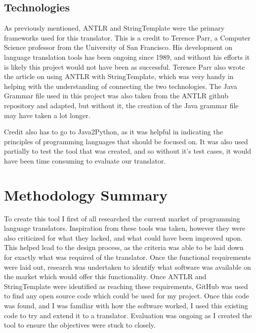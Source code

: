\documentclass{l4proj}
\begin{document}
\subsection{Technologies}
As previously mentioned, ANTLR and StringTemplate were the primary frameworks used for this translator. This is a credit to Terence Parr, a Computer Science professor from the University of San Francisco. His development on language translation tools has been ongoing since 1989, and without his efforts it is likely this project would not have been as successful.
Terence Parr also wrote the article on using ANTLR with StringTemplate, which was very handy in helping with the understanding of connecting the two technologies.
The Java Grammar file used in this project was also taken from the ANTLR github repository and adapted, but without it, the creation of the Java grammar file may have taken a lot longer.

Credit also has to go to Java2Python, as it was helpful in indicating the principles of programming languages that should be focused on. It was also used partially to test the tool that was created, and so without it's test cases, it would have been time consuming to evaluate our translator.

\section{Methodology Summary}
To create this tool I first of all researched the current market of programming language translators. Inspiration from these tools was taken, however they were also criticized for what they lacked, and what could have been improved upon.
This helped lead to the design process, as the criteria was able to be laid down for exactly what was required of the translator.
Once the functional requirements were laid out, research was undertaken to identify what software was available on the market which would offer this functionality. 
Once ANTLR and StringTemplate were identified as reaching these requirements, GitHub was used to find any open source code which could be used for my project.
Once this code was found, and I was familiar with how the software worked, I used this existing code to try and extend it to a translator.
Evaluation was ongoing as I created the tool to ensure the objectives were stuck to closely.
\end{document}
